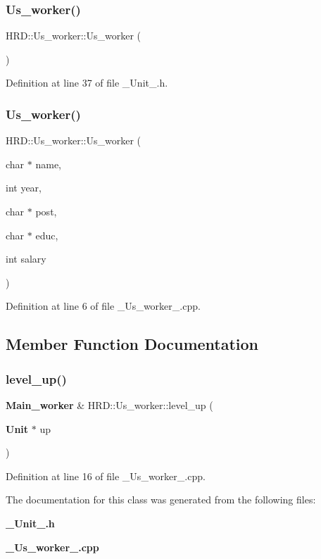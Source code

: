 \subsubsection{Us\+\_\+worker()\hspace{0.1cm}{\footnotesize\ttfamily [1/2]}}
{\footnotesize\ttfamily H\+R\+D\+::\+Us\+\_\+worker\+::\+Us\+\_\+worker (\begin{DoxyParamCaption}{ }\end{DoxyParamCaption})\hspace{0.3cm}{\ttfamily [inline]}}



Definition at line 37 of file \+\_\+\+Unit\+\_\+.\+h.

\mbox{\label{class_h_r_d_1_1_us__worker_ac0a6cff72a4b5f7f4f26e5a336f25c91}} 
\subsubsection{Us\+\_\+worker()\hspace{0.1cm}{\footnotesize\ttfamily [2/2]}}
{\footnotesize\ttfamily H\+R\+D\+::\+Us\+\_\+worker\+::\+Us\+\_\+worker (\begin{DoxyParamCaption}\item[{char $\ast$}]{name,  }\item[{int}]{year,  }\item[{char $\ast$}]{post,  }\item[{char $\ast$}]{educ,  }\item[{int}]{salary }\end{DoxyParamCaption})}



Definition at line 6 of file \+\_\+\+Us\+\_\+worker\+\_\+.\+cpp.



\subsection{Member Function Documentation}
\mbox{\label{class_h_r_d_1_1_us__worker_ab5059f9f2a77131ca271081d36e77080}} 
\subsubsection{level\+\_\+up()}
{\footnotesize\ttfamily \textbf{ Main\+\_\+worker} \& H\+R\+D\+::\+Us\+\_\+worker\+::level\+\_\+up (\begin{DoxyParamCaption}\item[{\textbf{ Unit} $\ast$}]{up }\end{DoxyParamCaption})}



Definition at line 16 of file \+\_\+\+Us\+\_\+worker\+\_\+.\+cpp.



The documentation for this class was generated from the following files\+:\begin{DoxyCompactItemize}
\item 
\textbf{ \+\_\+\+Unit\+\_\+.\+h}\item 
\textbf{ \+\_\+\+Us\+\_\+worker\+\_\+.\+cpp}\end{DoxyCompactItemize}

